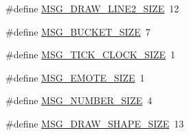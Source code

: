 \begin{DoxyCompactItemize}
\item 
\#define \mbox{\hyperlink{group__uart__wordgame_ga6d464c277485022347db4b9d5048c724}{M\+S\+G\+\_\+\+D\+R\+A\+W\+\_\+\+L\+I\+N\+E2\+\_\+\+S\+I\+ZE}}~12
\item 
\#define \mbox{\hyperlink{group__uart__wordgame_gab8e069b7d505e881a3ffe855d25d5387}{M\+S\+G\+\_\+\+B\+U\+C\+K\+E\+T\+\_\+\+S\+I\+ZE}}~7
\item 
\#define \mbox{\hyperlink{group__uart__wordgame_ga6761c5c0137ad3473bf79d157ca6c1e4}{M\+S\+G\+\_\+\+T\+I\+C\+K\+\_\+\+C\+L\+O\+C\+K\+\_\+\+S\+I\+ZE}}~1
\item 
\#define \mbox{\hyperlink{group__uart__wordgame_gaf8c5cc238fa51efa38731484b68e4f1a}{M\+S\+G\+\_\+\+E\+M\+O\+T\+E\+\_\+\+S\+I\+ZE}}~1
\item 
\#define \mbox{\hyperlink{group__uart__wordgame_gaf6d85437ff9341f4e7471cfbb7a9ac28}{M\+S\+G\+\_\+\+N\+U\+M\+B\+E\+R\+\_\+\+S\+I\+ZE}}~4
\item 
\#define \mbox{\hyperlink{group__uart__wordgame_gafd82f77aaa129b8ff2c21406af2b8467}{M\+S\+G\+\_\+\+D\+R\+A\+W\+\_\+\+S\+H\+A\+P\+E\+\_\+\+S\+I\+ZE}}~13
\end{DoxyCompactItemize}
